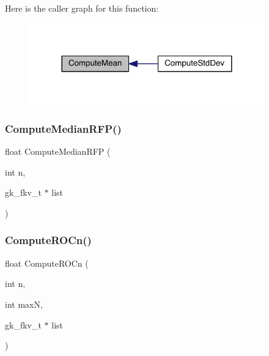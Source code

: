 Here is the caller graph for this function\+:\nopagebreak
\begin{figure}[H]
\begin{center}
\leavevmode
\includegraphics[width=288pt]{a00077_aeeed505299d523a6061b0c1966d88427_icgraph}
\end{center}
\end{figure}
\mbox{\label{a00077_a0712d76a8c05b906a790c20887ad1874}} 
\subsubsection{\texorpdfstring{Compute\+Median\+R\+F\+P()}{ComputeMedianRFP()}}
{\footnotesize\ttfamily float Compute\+Median\+R\+FP (\begin{DoxyParamCaption}\item[{int}]{n,  }\item[{gk\+\_\+fkv\+\_\+t $\ast$}]{list }\end{DoxyParamCaption})}

\mbox{\label{a00077_a8df1d3501976b7a3168df9f80ccf0cf6}} 
\subsubsection{\texorpdfstring{Compute\+R\+O\+Cn()}{ComputeROCn()}}
{\footnotesize\ttfamily float Compute\+R\+O\+Cn (\begin{DoxyParamCaption}\item[{int}]{n,  }\item[{int}]{maxN,  }\item[{gk\+\_\+fkv\+\_\+t $\ast$}]{list }\end{DoxyParamCaption})}

\mbox{\label{a00077_a59fad97dedb62ff1ae0722de46318412}} 
